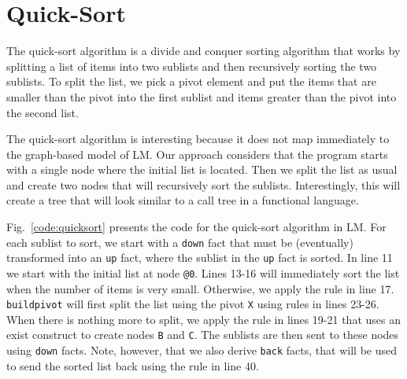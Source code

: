 \begin{comment}
test-diag-right(A, X, Y, [X1, Y1 | RestCoords], Nodes, Coords),
X = X1, Y = Y1
   -o 1. // fail

test-diag-right(A, X, Y, [X1, Y1 | RestCoords], Nodes, Coords),
X <> X1 || Y <> Y1
   -o test-diag-right(A, X - 1, Y + 1, RestCoords, Nodes, Coords).

send-down(A, Nodes, Coords),
!down(A, A)
   -o final-state(A, Nodes, Coords).
   
send-down(A, Nodes, Coords),
!down(A, B),
A <> B
   -o receive-down(B, Nodes, Coords).
\end{Verbatim}
  \caption{Visit program.}
  \label{code:visit}
\end{figure}
\normalsize
\end{comment}

\section{Quick-Sort}

The quick-sort algorithm is a divide and conquer sorting algorithm that works by splitting
a list of items into two sublists and then recursively sorting the two sublists.
To split the list, we pick a pivot element and put the items that are smaller than the pivot
into the first sublist and items greater than the pivot into the second list.

The quick-sort algorithm is interesting because it does not map immediately to the graph-based
model of LM. Our approach considers that the program starts with a single node where
the initial list is located. Then we split the list as usual and create two nodes
that will recursively sort the sublists. Interestingly, this will create a tree
that will look similar to a call tree in a functional language.

Fig.~\ref{code:quicksort} presents the code for the quick-sort algorithm in LM.
For each sublist to sort, we start with a \texttt{down} fact that must be (eventually)
transformed into an \texttt{up} fact, where the sublist in the \texttt{up} fact is sorted.
In line 11 we start with the initial list at node \texttt{@0}. Lines 13-16 will immediately
sort the list when the number of items is very small. Otherwise, we apply the rule in line 17.
\texttt{buildpivot} will first split the list using the pivot \texttt{X} using rules in
lines 23-26. When there is nothing more to split, we apply the rule in lines 19-21
that uses an exist construct to create nodes \texttt{B} and \texttt{C}. The sublists
are then sent to these nodes using \texttt{down} facts. Note, however, that we also
derive \texttt{back} facts, that will be used to send the sorted list back using the rule
in line 40.

